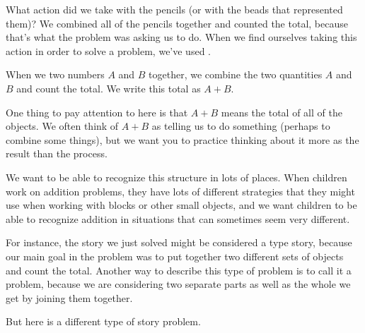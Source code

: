 \documentclass{ximera}
\begin{document}
What action did we take with the pencils (or with the beads that represented them)? We combined all of the pencils together and counted the total, because that's what the problem was asking us to do. When we find ourselves taking this action in order to solve a problem, we've used .

\begin{definition}
When we  two numbers $A$ and $B$ together, we combine the two quantities $A$ and $B$ and count the total. We write this total as $A+B$.
\end{definition}

One thing to pay attention to here is that $A+B$ means the total of all of the objects. We often think of $A+B$ as telling us to do something (perhaps to combine some things), but we want you to practice thinking about it more as the result than the process.

We want to be able to recognize this structure in lots of places. When children work on addition problems, they have lots of different strategies that they might use when working with blocks or other small objects, and we want children to be able to recognize addition in situations that can sometimes seem very different. 

For instance, the story we just solved might be considered a  type story, because our main goal in the problem was to put together two different sets of objects and count the total. Another way to describe this type of problem is to call it a  problem, because we are considering two separate parts as well as the whole we get by joining them together. 

But here is a different type of story problem.
\end{document}
